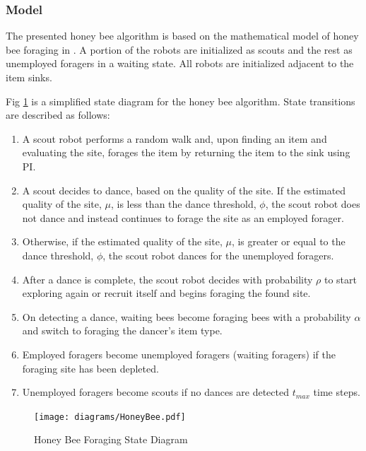 \subsubsection{Model}


The presented honey bee algorithm is based on the mathematical model of honey bee foraging in \cite{seeley2009wisdom}. A portion of the robots are initialized as scouts and the rest  as unemployed foragers in a waiting state. All robots are initialized adjacent to the item sinks.

Fig \ref{honeybeestate} is a simplified state diagram for the honey bee algorithm. State transitions are described as follows: 

\begin{enumerate}

\item A scout robot performs a random walk and, upon finding an item and evaluating the site, forages the item by returning the item to the sink using PI. 

\item A scout decides to dance, based on the quality of the site. If the estimated quality of the site, $\mu$, is less than the dance threshold, $\phi$, the scout robot does not dance and instead continues to forage the site as an employed forager.

\item Otherwise, if the estimated quality of the site, $\mu$, is greater or equal to the dance threshold, $\phi$, the scout robot dances for the unemployed foragers.

\item After a dance is complete, the scout robot decides with probability $\rho$ to start exploring again or recruit itself and begins foraging the found site.

\item On detecting a dance, waiting bees become foraging bees with a probability $\alpha$ and switch to foraging the dancer's item type.

\item Employed foragers become unemployed foragers (waiting foragers) if the foraging site has been depleted.

\item Unemployed foragers become scouts if no dances are detected $t_{max}$ time steps.

\end{enumerate}

\begin{figure}[h]
	\centering
	\texttt{[image: diagrams/HoneyBee.pdf]}
	\caption{Honey Bee Foraging State Diagram }
	\label{honeybeestate}
\end{figure}

